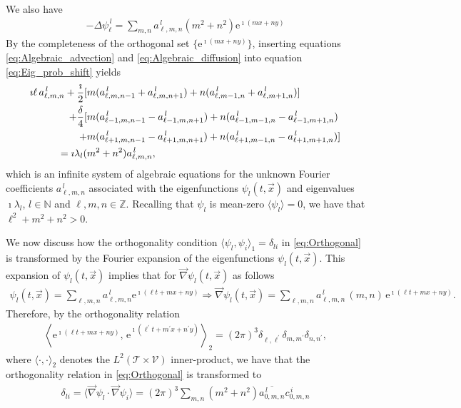 \documentclass{article}
\newcommand{\e}{\mathrm{e}}
\newcommand{\Tc}{\mathcal{T}}
\newcommand{\Vc}{\mathcal{V}}
\newcommand{\0}{\mathbf{0}}
\newcommand{\1}{\mathbf{1}}
\newcommand{\2}{\mathbf{2}}
\newcommand{\3}{\mathbf{3}}
\newcommand{\4}{\mathbf{4}}
\newcommand{\5}{\mathbf{5}}
\newcommand{\6}{\mathbf{6}}
\newcommand{\7}{\mathbf{7}}
\newcommand{\8}{\mathbf{8}}
\begin{document}
%
We also have 
%
\begin{align}\label{eq:Algebraic_diffusion}
  -\Delta\psi_\ell^{\,l}=\sum_{m,n}a^{\,l}_{\ell,m,n}(m^2+n^2)\e^{\imath (mx+ny)}
\end{align}
%
By the completeness of the orthogonal set $\{\e^{\imath (mx+ny)}\}$, 
inserting equations \eqref{eq:Algebraic_advection} and
\eqref{eq:Algebraic_diffusion} into equation
\eqref{eq:Eig_prob_shift} yields
%
\begin{align}\label{eq:Fourier_Coef_System}
\imath \ell\,a^{\,l}_{\ell,m,n}+\frac{\imath}{2}
[&m(a^{\,l}_{\ell,m,n-1}+a^{\,l}_{\ell,m,n+1})+n(a^{\,l}_{\ell,m-1,n}+a^{\,l}_{\ell,m+1,n})]
\notag\\
+\frac{\delta}{4}[&m(a^{\,l}_{\ell-1,m,n-1}-a^{\,l}_{\ell-1,m,n+1})+n(a^{\,l}_{\ell-1,m-1,n}-a^{\,l}_{\ell-1,m+1,n})
\notag\\
+&m(a^{\,l}_{\ell+1,m,n-1}-a^{\,l}_{\ell+1,m,n+1})+n(a^{\,l}_{\ell+1,m-1,n}-a^{\,l}_{\ell+1,m+1,n})]
\notag\\
=\imath\lambda_l(&m^2+n^2)a^{\,l}_{\ell,m,n},
\end{align}
%
which is an infinite system of algebraic equations for the unknown
Fourier coefficients $a^{\,l}_{\ell,m,n}$ associated with the
eigenfunctions $\psi_l(t,\vec{x})$ and eigenvalues $\imath\lambda_l$,
$l\in\mathbb{N}$ and $\ell,m,n\in\mathbb{Z}$. Recalling that $\psi_l$ is
mean-zero $\langle\psi_l\rangle=0$, we have that $\ell^2+m^2+n^2>0$.




We now discuss how the orthogonality condition
$\langle\psi_l,\psi_i\rangle_1=\delta_{li}$ in \eqref{eq:Orthogonal} is
transformed by the Fourier expansion of the
eigenfunctions $\psi_l(t,\vec{x})$. This expansion of $\psi_l(t,\vec{x})$ 
implies that for $\vec{\nabla}\psi_l(t,\vec{x})$ as follows 
%
\begin{align}\label{eq:Eigenfunction_Grad_expansion}
  \psi_l(t,\vec{x})=\sum_{\ell,m,n}a^{\,l}_{\ell,m,n}\e^{\imath (\ell t+mx+ny)}\Rightarrow
  \vec{\nabla}\psi_l(t,\vec{x})=\sum_{\ell,m,n}a^{\,l}_{\ell,m,n}\,(m,n)\,\e^{\imath (\ell t+mx+ny)}.
\end{align}
%
Therefore, by the orthogonality relation 
%
\begin{align}\label{eq:Trig_orthogonal}  
      \left\langle
      \e^{\imath (\ell t+mx+ny)},\,\e^{\imath (\ell^\prime t+m^\prime x+n^\prime y)}
      \right\rangle_2
      =
      (2\pi)^3\delta_{\ell,\ell^\prime}\delta_{m,m^\prime}\delta_{n,n^\prime},
\end{align}
%
where $\langle\cdot,\cdot\rangle_2$ denotes the $L^2(\Tc\times\Vc)$ inner-product, we have that
the orthogonality relation in \eqref{eq:Orthogonal} is transformed to  
%
\begin{align}\label{eq:Ortho_Clmn}
  \delta_{li}=\langle\vec{\nabla}\psi_l\cdot\vec{\nabla}\psi_i\rangle
      = (2\pi)^3\sum_{m,n}(m^2+n^2)\overline{a^{\,l}_{0,m,n}}c^{\,i}_{0,m,n}
\end{align}
%
\end{document}
